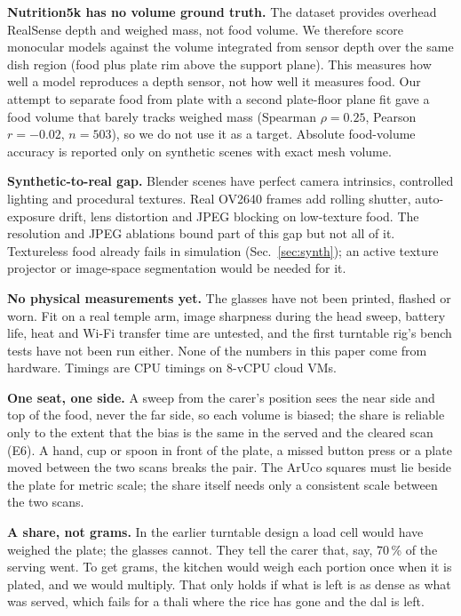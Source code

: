 \textbf{Nutrition5k has no volume ground truth.} The dataset provides
overhead RealSense depth and weighed mass, not food volume. We therefore score
monocular models against the volume integrated from sensor depth over the same
dish region (food plus plate rim above the support plane). This measures how
well a model reproduces a depth sensor, not how well it measures food. Our
attempt to separate food from plate with a second plate-floor plane fit gave a
food volume that barely tracks weighed mass (Spearman $\rho=0.25$,
Pearson $r=-0.02$, $n=503$), so we do not use it as a target. Absolute food-volume
accuracy is reported only on synthetic scenes with exact mesh volume.

\textbf{Synthetic-to-real gap.} Blender scenes have perfect camera intrinsics,
controlled lighting and procedural textures. Real OV2640 frames add rolling
shutter, auto-exposure drift, lens distortion and JPEG blocking on low-texture
food. The resolution and JPEG ablations bound part of this gap but not all of it. Textureless food already fails in simulation (Sec.~\ref{sec:synth}); an active texture projector or image-space segmentation would be needed for it.

\textbf{No physical measurements yet.} The glasses have not been printed,
flashed or worn. Fit on a real temple arm, image sharpness during the head
sweep, battery life, heat and Wi-Fi transfer time are untested, and the first
turntable rig's bench tests have not been run either. None of the numbers in
this paper come from hardware. Timings are CPU timings on 8-vCPU cloud VMs.

\textbf{One seat, one side.} A sweep from the carer's position sees the near
side and top of the food, never the far side, so each volume is biased; the
share is reliable only to the extent that the bias is the same in the served
and the cleared scan (E6). A hand, cup or spoon in front of the plate, a
missed button press or a plate moved between the two scans breaks the pair.
The ArUco squares must lie beside the plate for metric scale; the share itself
needs only a consistent scale between the two scans.

\textbf{A share, not grams.} In the earlier turntable design a load cell
would have weighed the plate; the glasses cannot. They tell the carer that, say,
70\,\% of the serving went. To get grams, the kitchen would weigh each portion
once when it is plated, and we would multiply. That only holds if what is left
is as dense as what was served, which fails for a thali where the rice has gone
and the dal is left.

